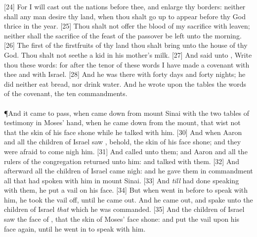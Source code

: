 [24] \textcolor[cmyk]{0.99998,1,0,0}{For I will cast out the nations before thee, and enlarge thy borders: neither shall any man desire thy land, when thou shalt go up to appear before  thy God thrice in the year.}
[25] \textcolor[cmyk]{0.99998,1,0,0}{Thou shalt not offer the blood of my sacrifice with leaven; neither shall the sacrifice of the feast of the passover be left unto the morning.}
[26] \textcolor[cmyk]{0.99998,1,0,0}{The first of the firstfruits of thy land thou shalt bring unto the house of  thy God. Thou shalt not seethe a kid in his mother's milk.}
[27] \textcolor[cmyk]{0.99998,1,0,0}{And  said unto , Write thou these words: for after the tenor of these words I have made a covenant with thee and with Israel.}
[28] \textcolor[cmyk]{0.99998,1,0,0}{And he was there with  forty days and forty nights; he did neither eat bread, nor drink water. And he wrote upon the tables the words of the covenant, the ten commandments.}\\
\\
\P \textcolor[cmyk]{0.99998,1,0,0}{And it came to pass, when  came down from mount Sinai with the two tables of testimony in Moses' hand, when he came down from the mount, that  wist not that the skin of his face shone while he talked with him.}
[30] \textcolor[cmyk]{0.99998,1,0,0}{And when Aaron and all the children of Israel saw , behold, the skin of his face shone; and they were afraid to come nigh him.}
[31] \textcolor[cmyk]{0.99998,1,0,0}{And  called unto them; and Aaron and all the rulers of the congregation returned unto him: and  talked with them.}
[32] \textcolor[cmyk]{0.99998,1,0,0}{And afterward all the children of Israel came nigh: and he gave them in commandment all that  had spoken with him in mount Sinai.}
[33] \textcolor[cmyk]{0.99998,1,0,0}{And \emph{till}  had done speaking with them, he put a vail on his face.}
[34] \textcolor[cmyk]{0.99998,1,0,0}{But when  went in before  to speak with him, he took the vail off, until he came out. And he came out, and spake unto the children of Israel \emph{that} which he was commanded.}
[35] \textcolor[cmyk]{0.99998,1,0,0}{And the children of Israel saw the face of , that the skin of Moses' face shone: and  put the vail upon his face again, until he went in to speak with him.}